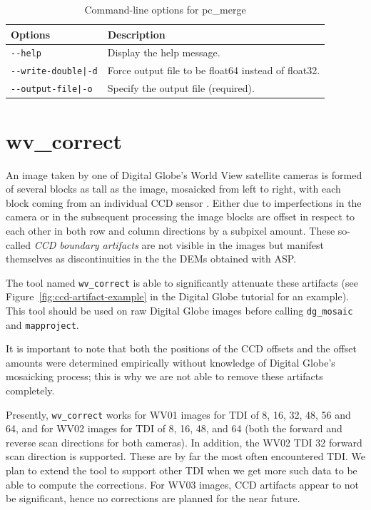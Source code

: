 \medskip

\begin{longtable}{|l|p{10cm}|}
\caption{Command-line options for pc\_merge}
\label{tbl:pcmerge}
\endfirsthead
\endhead
\endfoot
\endlastfoot
\hline
Options & Description \\ \hline \hline
\texttt{-\/-help} & Display the help message.\\ \hline
\texttt{-\/-write-double|-d} & Force output file to be float64 instead of float32.\\ \hline
\texttt{-\/-output-file|-o} & Specify the output file (required).\\ \hline
\end{longtable}

\section{wv\_correct}
\label{wvcorrect}

An image taken by one of Digital Globe's World View satellite cameras is
formed of several blocks as tall as the image, mosaicked from left to
right, with each block coming from an individual CCD sensor
\cite{digital-globe:camera}. Either due to imperfections in the camera
or in the subsequent processing the image blocks are offset in
respect to each other in both row and column directions by a subpixel
amount. These so-called {\it CCD boundary artifacts} are not visible in
the images but manifest themselves as discontinuities in the the DEMs
obtained with ASP.

The tool named \texttt{wv\_correct} is able to significantly attenuate
these artifacts (see Figure~\ref{fig:ccd-artifact-example} in the
Digital Globe tutorial for an example). This tool should be used on raw
Digital Globe images before calling \texttt{dg\_mosaic} and
\texttt{mapproject}.

It is important to note that both the positions of the CCD offsets and
the offset amounts were determined empirically without knowledge of
Digital Globe's mosaicking process; this is why we are not able to
remove these artifacts completely.

Presently, \texttt{wv\_correct} works for WV01 images for TDI of 8, 16, 32,
48, 56 and 64, and for WV02 images for TDI of 8, 16, 48, and 64 (both the
forward and reverse scan directions for both cameras). In addition, the
WV02 TDI 32 forward scan direction is supported. These are by far the
most often encountered TDI. We plan to extend the tool to support other
TDI when we get more such data to be able to compute the
corrections. For WV03 images, CCD artifacts appear to not be
significant, hence no corrections are planned for the near future.

